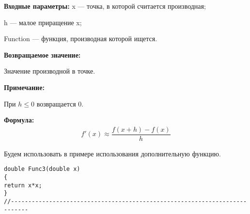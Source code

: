 \textbf{Входные параметры:}
 x --- точка, в которой считается производная;
 
 h --- малое приращение x;
 
 Function --- функция, производная которой ищется.

\textbf{Возвращаемое значение:}
 
 Значение производной в точке.
 
 \textbf{Примечание:}
 
 При $h\leq0$ возвращается $0$.

\textbf{Формула:}
\begin{eqnarray*}
f'\left( x\right) \approx \dfrac{f\left( x+h\right)-f\left( x\right) }{h}
\end{eqnarray*}

Будем использовать в примере использования дополнительную функцию.

\begin{lstlisting}[caption=Дополнительная функция]
double Func3(double x)
{
return x*x;
}
//---------------------------------------------------------------------------
\end{lstlisting}